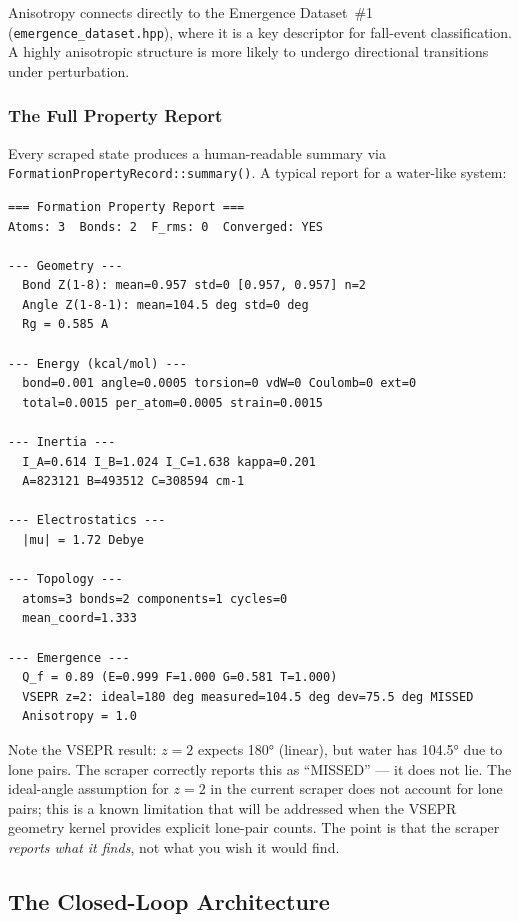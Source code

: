 \documentclass[11pt, a4paper, oneside]{article}
\theoremstyle{definition}
\theoremstyle{remark}
\begin{document}
Anisotropy connects directly to the Emergence Dataset~\#1
(\texttt{emergence\_dataset.hpp}), where it is a key descriptor for
fall-event classification.  A highly anisotropic structure is more
likely to undergo directional transitions under perturbation.

\subsubsection{The Full Property Report}

Every scraped state produces a human-readable summary via
\texttt{FormationPropertyRecord::summary()}.  A typical report for a
water-like system:

\begin{lstlisting}[basicstyle=\ttfamily\footnotesize]
=== Formation Property Report ===
Atoms: 3  Bonds: 2  F_rms: 0  Converged: YES

--- Geometry ---
  Bond Z(1-8): mean=0.957 std=0 [0.957, 0.957] n=2
  Angle Z(1-8-1): mean=104.5 deg std=0 deg
  Rg = 0.585 A

--- Energy (kcal/mol) ---
  bond=0.001 angle=0.0005 torsion=0 vdW=0 Coulomb=0 ext=0
  total=0.0015 per_atom=0.0005 strain=0.0015

--- Inertia ---
  I_A=0.614 I_B=1.024 I_C=1.638 kappa=0.201
  A=823121 B=493512 C=308594 cm-1

--- Electrostatics ---
  |mu| = 1.72 Debye

--- Topology ---
  atoms=3 bonds=2 components=1 cycles=0
  mean_coord=1.333

--- Emergence ---
  Q_f = 0.89 (E=0.999 F=1.000 G=0.581 T=1.000)
  VSEPR z=2: ideal=180 deg measured=104.5 deg dev=75.5 deg MISSED
  Anisotropy = 1.0
\end{lstlisting}

Note the VSEPR result: $z = 2$ expects 180° (linear), but water has
104.5° due to lone pairs.  The scraper correctly reports this as
``MISSED'' — it does not lie.  The ideal-angle assumption for $z = 2$
in the current scraper does not account for lone pairs; this is a
known limitation that will be addressed when the VSEPR geometry kernel
provides explicit lone-pair counts.  The point is that the scraper
\textit{reports what it finds}, not what you wish it would find.

\subsection{The Closed-Loop Architecture}
\label{sec:closed-loop}
\end{document}
